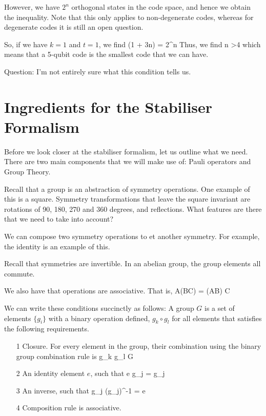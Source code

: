 However, we have $2^n$ orthogonal states in the code space, and hence we obtain the inequality. Note that this only applies to non-degenerate codes, whereas for degenerate codes it is still an open question. 

So, if we have $k = 1$ and $t = 1$, we find
(1 + 3n) = 2^n
\eeq
Thus, we find
\beq
n >4
\eeq
which means that a 5-qubit code is the smallest code that we can have. 

Question: I'm not entirely sure what this condition tells us. 

\section{Ingredients for the Stabiliser Formalism}
Before we look closer at the stabiliser formalism, let us outline what we need. There are two main components that we will make use of: Pauli operators and Group Theory. 

Recall that a group is an abstraction of symmetry operations. One example of this is a square. Symmetry transformations that leave the square invariant are rotations of 90, 180, 270 and 360 degrees, and reflections. What features are there that we need to take into account? 

We can compose two symmetry operations to et another symmetry. For example, the identity is an example of this. 

Recall that symmetries are invertible. In an abelian group, the group elements all commute. 

We also have that operations are associative. That is, 
\beq
A(BC) = (AB) C
\eeq

We can write these conditions succinctly as follows: A group  $G$ is a set of elements $\{g_i\}$ with a binary operation defined, $g_k \circ g_l$ for all elements that satisfies the following requirements. 
\begin{itemize}
\item[1] Closure. For every element in the group, their combination using the binary group combination rule is
\beq
g_k \circ g_l \in G
\eeq

\item[2] An identity element $e$, such that 
\beq
e \circ g_j = g_j
\eeq

\item[3] An inverse, such that 
\beq
g_j (g_j)^{-1} = e
\eeq

\item[4] Composition rule is associative. 
\end{itemize}

